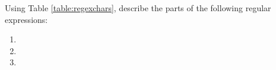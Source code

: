 \begin{problem}
Using Table \ref{table:regexchars}, describe the parts of the following regular expressions:
\begin{enumerate}
\item {}
\item {}
\item {}
\end{enumerate}
\label{prob:readingregex}
\end{problem}


